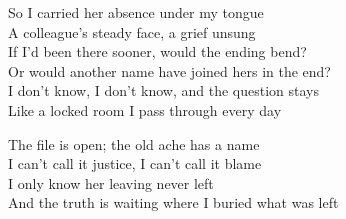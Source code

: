 \begin{lyrics}
So I carried her absence under my tongue\\
A colleague’s steady face, a grief unsung\\
If I’d been there sooner, would the ending bend?\\
Or would another name have joined hers in the end?\\
I don’t know, I don’t know, and the question stays\\
Like a locked room I pass through every day

The file is open; the old ache has a name\\
I can’t call it justice, I can’t call it blame\\
I only know her leaving never left\\
And the truth is waiting where I buried what was left
\end{lyrics}

